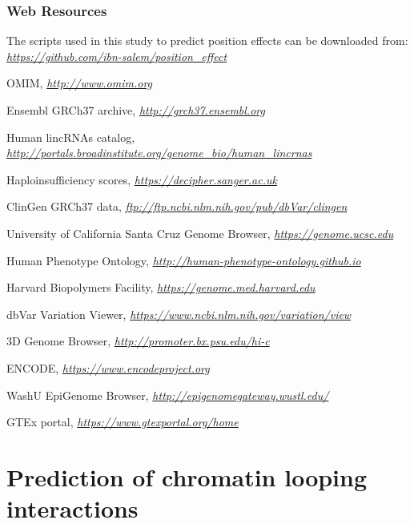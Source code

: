 \documentclass[a4paper,twoside=true,openright,parskip=full,chapterprefix=true,11pt,headings=normal,bibliography=totoc,listof=totoc,titlepage=on,captions=tableabove,draft=false]{scrreprt}
\theoremstyle{definition}
\theoremstyle{definition}
\theoremstyle{definition}
\theoremstyle{remark}
\begin{document}
\hypertarget{web-resources}{%
\subsection{Web Resources}\label{web-resources}}

The scripts used in this study to predict position effects can be
downloaded from:
\href{https://github.com/ibn-salem/position_effect}{\emph{https://github.com/ibn-salem/position\_effect}}

OMIM, \href{http://www.omim.org/}{\emph{http://www.omim.org}}

Ensembl GRCh37 archive,
\href{http://grch37.ensembl.org/}{\emph{http://grch37.ensembl.org}}

Human lincRNAs catalog,
\href{http://portals.broadinstitute.org/genome_bio/human_lincrnas}{\emph{http://portals.broadinstitute.org/genome\_bio/human\_lincrnas}}

Haploinsufficiency scores,
\href{https://decipher.sanger.ac.uk/}{\emph{https://decipher.sanger.ac.uk}}

ClinGen GRCh37 data,
\href{ftp://ftp.ncbi.nlm.nih.gov/pub/dbVar/clingen}{\emph{ftp://ftp.ncbi.nlm.nih.gov/pub/dbVar/clingen}}

University of California Santa Cruz Genome Browser,
\href{https://genome.ucsc.edu/}{\emph{https://genome.ucsc.edu}}

Human Phenotype Ontology,
\href{http://human-phenotype-ontology.github.io/}{\emph{http://human-phenotype-ontology.github.io}}

Harvard Biopolymers Facility,
\href{https://genome.med.harvard.edu/}{\emph{https://genome.med.harvard.edu}}

dbVar Variation Viewer,
\href{https://www.ncbi.nlm.nih.gov/variation/view}{\emph{https://www.ncbi.nlm.nih.gov/variation/view}}

3D Genome Browser,
\href{http://promoter.bx.psu.edu/hi-c}{\emph{http://promoter.bx.psu.edu/hi-c}}

ENCODE,
\href{https://www.encodeproject.org/}{\emph{https://www.encodeproject.org}}

WashU EpiGenome Browser,
\href{http://epigenomegateway.wustl.edu/}{\emph{http://epigenomegateway.wustl.edu/}}

GTEx portal,
\href{https://www.gtexportal.org/home}{\emph{https://www.gtexportal.org/home}}

\hypertarget{loop}{%
\chapter{Prediction of chromatin looping interactions}\label{loop}}
\end{document}
